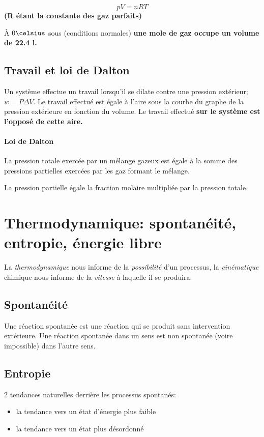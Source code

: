 \documentclass[11pt,a4paper,french]{article}
\renewcommand{\textbf}[1]{\begingroup\bfseries\mathversion{bold}#1\endgroup}
\begin{document}
\textbf{$$pV=nRT$$}
(R étant la constante des gaz parfaits)

\`A $0\celsius$ sous  (conditions normales) \textbf{une mole} de gaz occupe un volume de \textbf{22.4 l}.

\subsection{Travail et loi de Dalton}

Un système effectue un travail lorsqu'il se dilate contre une pression extérieur; $w=P\Delta V$.
Le travail effectué est égale à l'aire sous la courbe du graphe de la pression extérieure en fonction du volume.
Le travail effectué \textbf{sur} le système est l'opposé de cette aire.

\paragraph{Loi de Dalton} La pression totale exercée par un mélange gazeux est égale à la somme des pressions partielles exercées par les gaz formant le mélange.

La pression partielle égale la fraction molaire multipliée par la pression totale.


\section{Thermodynamique: spontanéité, entropie, énergie libre}

La \emph{thermodynamique} nous informe de la \emph{possibilité} d'un processus, la \emph{cinématique} chimique nous informe de la \emph{vitesse} à laquelle il se produira.

\subsection{Spontanéité}

Une réaction spontanée est une réaction qui se produit sans intervention extérieure.
Une réaction spontanée dans un sens est non spontanée (voire impossible) dans l'autre sens.

\subsection{Entropie}

2 tendances naturelles derrière les processus spontanés:
\begin{itemize}
\item la tendance vers un état d'énergie plus faible
\item la tendance vers un état plus désordonné
\end{itemize}
\end{document}
